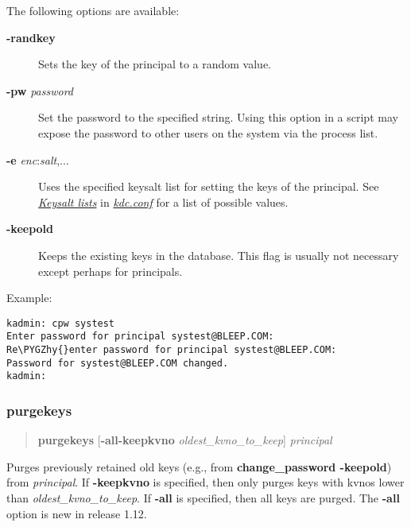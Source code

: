 \documentclass[letterpaper,10pt,english]{sphinxmanual}
\def\PYGZhy{\char`\-}
\begin{document}
The following options are available:
\begin{description}
\item[{\textbf{-randkey}}] \leavevmode
Sets the key of the principal to a random value.

\item[{\textbf{-pw} \emph{password}}] \leavevmode
Set the password to the specified string.  Using this option in a
script may expose the password to other users on the system via
the process list.

\item[{\textbf{-e} \emph{enc}:\emph{salt},...}] \leavevmode
Uses the specified keysalt list for setting the keys of the
principal.  See {\hyperref[admin/conf_files/kdc_conf:keysalt-lists]{\emph{Keysalt lists}}} in {\hyperref[admin/conf_files/kdc_conf:kdc-conf-5]{\emph{kdc.conf}}} for a
list of possible values.

\item[{\textbf{-keepold}}] \leavevmode
Keeps the existing keys in the database.  This flag is usually not
necessary except perhaps for  principals.

\end{description}

Example:

\begin{Verbatim}[commandchars=\\\{\}]
kadmin: cpw systest
Enter password for principal systest@BLEEP.COM:
Re\PYGZhy{}enter password for principal systest@BLEEP.COM:
Password for systest@BLEEP.COM changed.
kadmin:
\end{Verbatim}
\label{admin/admin_commands/kadmin_local:change-password-end}

\subsubsection{purgekeys}
\label{admin/admin_commands/kadmin_local:id6}\label{admin/admin_commands/kadmin_local:change-password-end}\label{admin/admin_commands/kadmin_local:purgekeys}\begin{quote}

\textbf{purgekeys} {[}\textbf{-all}\textbar{}\textbf{-keepkvno} \emph{oldest\_kvno\_to\_keep}{]} \emph{principal}
\end{quote}

Purges previously retained old keys (e.g., from \textbf{change\_password
-keepold}) from \emph{principal}.  If \textbf{-keepkvno} is specified, then
only purges keys with kvnos lower than \emph{oldest\_kvno\_to\_keep}.  If
\textbf{-all} is specified, then all keys are purged.  The \textbf{-all} option
is new in release 1.12.
\end{document}
